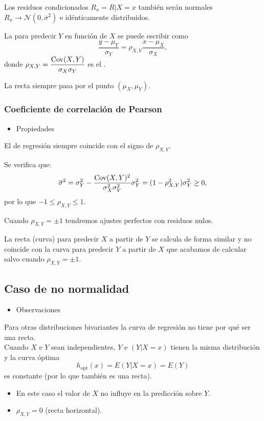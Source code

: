 Los residuos condicionados $R_x=R|X=x$ también serán normales $R_x\longrightarrow \mathcal{N}(0,\overline{\sigma}^2)$ e idénticamente distribuidos.

La  para predecir $Y$ en función de $X$ se puede escribir como \[ \dfrac{y-\mu_Y}{\sigma_Y}=\rho_{X,Y}\dfrac{x-\mu_X}{\sigma_X}, \]donde $\rho_{X,Y}=\dfrac{\operatorname{Cov}(X,Y)}{\sigma_X\sigma_Y}$ es el .

La recta siempre pasa por el punto $(\mu_X,\mu_Y)$.
\subsubsection{Coeficiente de correlación de Pearson}
\begin{itemize}[label=\color{red}\textbullet, leftmargin=*]
	\item \color{lightblue}Propiedades
\end{itemize}
El  de regresión siempre coincide con el signo de $\rho_{X,Y}$.

Se verifica que: \[ \overline{\sigma}^2=\sigma_Y^2-\dfrac{\operatorname{Cov}(X,Y)^2}{\sigma_X^2\sigma_Y^2}\sigma_Y^2=(1-\rho_{X,Y}^2)\sigma_Y^2\ge0, \]por lo que $-1\le\rho_{X,Y}\le1$.

Cuando $\rho_{X,Y}=\pm1$ tendremos ajustes perfectos con residuos nulos.

La recta (curva) para predecir $X$ a partir de $Y$ se calcula de forma similar y no coincide con la curva para predecir $Y$ a partir de $X$ que acabamos de calcular salvo cuando $\rho_{X,Y}=\pm1$.
\subsection{Caso de no normalidad}
\begin{itemize}[label=\color{red}\textbullet, leftmargin=*]
	\item \color{lightblue}Observaciones
\end{itemize}
Para otras distribuciones bivariantes la curva de regresión no tiene por qué ser una recta.\\
Cuando $X$ e $Y$ sean independientes, $Y$ e $(Y|X=x)$ tienen la misma distribución y la curva óptima \[ h_{\mathrm{opt}}(x)=E(Y|X=x)=E(Y) \] es constante (por lo que también es una recta).
\begin{itemize}[label=\color{lightblue}$\to$]
\item En este caso el valor de $X$ no influye en la predicción sobre $Y$.
\item $\rho_{X,Y}=0$ (recta horizontal).
\end{itemize}
